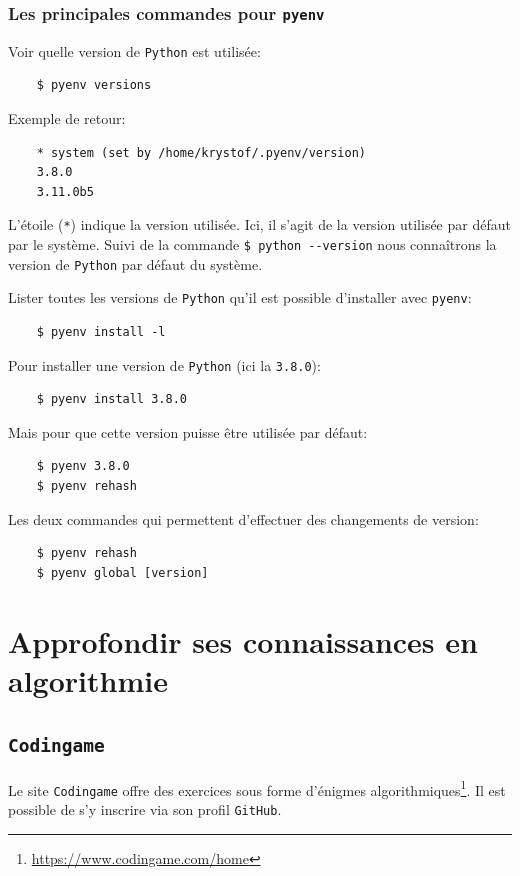 \documentclass[a4paper,11pt]{book}
\begin{document}
\subsection*{Les principales commandes pour \texttt{pyenv}}
Voir quelle version de \texttt{Python} est utilisée:
\begin{verbatim}
    $ pyenv versions
\end{verbatim}
\medskip

Exemple de retour:
\begin{verbatim}
    * system (set by /home/krystof/.pyenv/version)
    3.8.0
    3.11.0b5
\end{verbatim}
\medskip

L'étoile (\texttt{*}) indique la version utilisée. Ici, il s'agit de la version utilisée par défaut par le système. Suivi de la commande \verb|$ python --version| nous connaîtrons la version de \texttt{Python} par défaut du système.
\medskip

Lister toutes les versions de \texttt{Python} qu'il est possible d'installer avec \texttt{pyenv}:
\begin{verbatim}
    $ pyenv install -l
\end{verbatim}
\medskip

Pour installer une version de \texttt{Python} (ici la \texttt{3.8.0}):
\begin{verbatim}
    $ pyenv install 3.8.0
\end{verbatim}
\medskip

Mais pour que cette version puisse être utilisée par défaut:
\begin{verbatim}
    $ pyenv 3.8.0
    $ pyenv rehash
\end{verbatim}
\medskip

Les deux commandes qui permettent d'effectuer des changements de version:
\begin{verbatim}
    $ pyenv rehash
    $ pyenv global [version]
\end{verbatim}
\medskip

\chapter{Approfondir ses connaissances en algorithmie}
\section{\texttt{Codingame}}
Le site \texttt{Codingame} offre des exercices sous forme d'énigmes algorithmiques\footnote{\url{https://www.codingame.com/home}}. Il est possible de s'y inscrire via son profil \texttt{GitHub}.
\medskip
\end{document}
